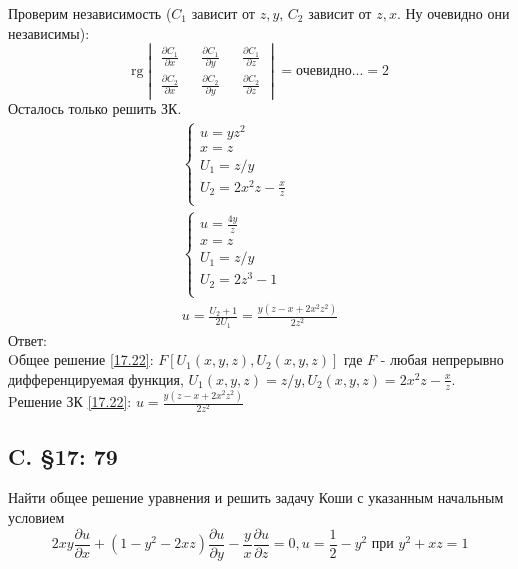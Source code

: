 \documentclass{article}
\newcommand{\rg}{\text{rg}}
\begin{document}
Проверим независимость ($C_1$ зависит от $z,y$, $C_2$ зависит от $z,x$. Ну очевидно они независимы): 
\begin{equation*}
    \rg \begin{vmatrix}
        \frac{\partial C_1}{\partial x} && \frac{\partial C_1}{\partial y} && \frac{\partial C_1}{\partial z}\\
        \frac{\partial C_2}{\partial x} && \frac{\partial C_2}{\partial y} && \frac{\partial C_2}{\partial z}
    \end{vmatrix} = \text{очевидно...} = 2
\end{equation*}
Осталось только решить ЗК.
\begin{gather*}
\begin{cases}
        u=yz^2\\
        x=z\\
        U_1=z/y\\
        U_2=2x^2z- \frac{x}{z}\\
    \end{cases}    \\
    \begin{cases}
        u=\frac{4y}{z}\\
         x=z\\
        U_1=z/y\\
        U_2=2z^3 - 1\\
    \end{cases}    \\
    u=\frac{U_2+1}{2U_1} = \frac{y\left(z-x+2 x^{2} z^{2}\right)}{2 z^{2}}
\end{gather*}
Ответ:\\
 Oбщее решение \ref{17.22}: $F[U_1(x,y,z),U_2(x,y,z)]$ где $F$ - любая непрерывно дифференцируемая функция, $U_1(x,y,z)=z/y, U_2(x,y,z)=2x^2z- \frac{x}{z}$.\\
 Pешение ЗК \ref{17.22}: $u=\frac{y\left(z-x+2 x^{2} z^{2}\right)}{2 z^{2}}$

\subsection{C. \S17: 79}
Найти общее решение уравнения и решить задачу Коши с указанным
начальным условием
\begin{equation}\label{17.79}
2 x y \frac{\partial u}{\partial x}+\left(1-y^{2}-2 x z\right) \frac{\partial u}{\partial y}-\frac{y}{x} \frac{\partial u}{\partial z}=0, u=\frac{1}{2}-y^{2} \text { при } y^{2}+x z=1
\end{equation}
\end{document}
